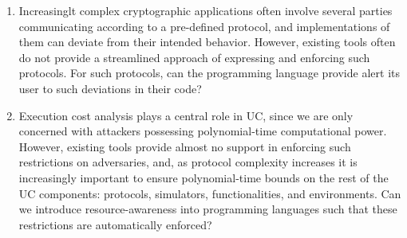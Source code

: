 \begin{enumerate}
\item Increasinglt complex cryptographic applications often involve several parties communicating according to a pre-defined protocol, and implementations of them can deviate from their intended behavior.
However, existing tools often do not provide a streamlined approach of expressing and enforcing
such protocols.
For such protocols, can the programming language provide alert its user to such deviations in their code?

\item Execution cost analysis plays a central role in UC, since we are only concerned with
attackers possessing polynomial-time computational power.
However, existing tools provide almost no support in enforcing such restrictions on adversaries, and,
as protocol complexity increases it is increasingly important to ensure polynomial-time bounds on the
rest of the UC components: protocols, simulators, functionalities, and environments.
Can we introduce resource-awareness into programming languages such that these restrictions
are automatically enforced?

\end{enumerate}

